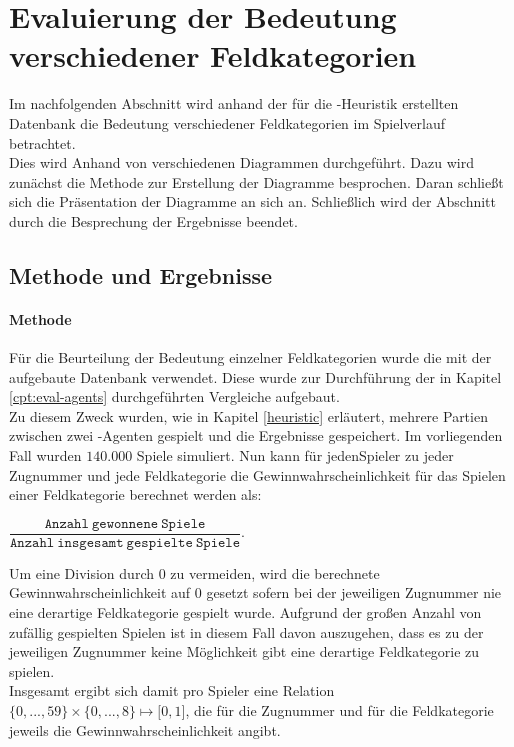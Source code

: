 \section{Evaluierung der Bedeutung verschiedener Feldkategorien}
Im nachfolgenden Abschnitt wird anhand der für die -Heuristik erstellten Datenbank die Bedeutung verschiedener Feldkategorien im Spielverlauf betrachtet.
\\Dies wird Anhand von verschiedenen Diagrammen durchgeführt. Dazu wird zunächst die Methode zur Erstellung der Diagramme besprochen. Daran schließt sich die Präsentation der Diagramme an sich an. Schließlich wird der Abschnitt durch die Besprechung der Ergebnisse beendet.
\subsection{Methode und Ergebnisse}
\paragraph{Methode}
Für die Beurteilung der Bedeutung einzelner Feldkategorien wurde die mit der  aufgebaute Datenbank verwendet. Diese wurde zur Durchführung der in Kapitel \ref{cpt:eval-agents} durchgeführten Vergleiche aufgebaut.
\\Zu diesem Zweck wurden, wie in Kapitel \ref{heuristic} erläutert, mehrere Partien zwischen zwei -Agenten gespielt und die Ergebnisse gespeichert. Im vorliegenden Fall wurden $140.000$ Spiele simuliert. Nun kann für jedenSpieler zu jeder Zugnummer und jede Feldkategorie die Gewinnwahrscheinlichkeit für das Spielen einer Feldkategorie berechnet werden als: 
\vspace{0.25cm}
\begin{center}
$\dfrac{\mathtt{Anzahl\ gewonnene\ Spiele}}{\mathtt{Anzahl\ insgesamt\ gespielte\ Spiele}}$.
\end{center}
\vspace{0.25cm}
Um eine Division durch $0$ zu vermeiden, wird die berechnete Gewinnwahrscheinlichkeit auf $0$ gesetzt sofern bei der jeweiligen Zugnummer nie eine derartige Feldkategorie gespielt wurde. Aufgrund der großen Anzahl von zufällig gespielten Spielen ist in diesem Fall davon auszugehen, dass es zu der jeweiligen Zugnummer keine Möglichkeit gibt eine derartige Feldkategorie zu spielen. 
\\Insgesamt ergibt sich damit pro Spieler eine Relation $\lbrace0, ..., 59\rbrace\times\lbrace0, ..., 8\rbrace\mapsto\lbrack0,1\rbrack$, die für die Zugnummer und für die Feldkategorie jeweils die Gewinnwahrscheinlichkeit angibt.
  
